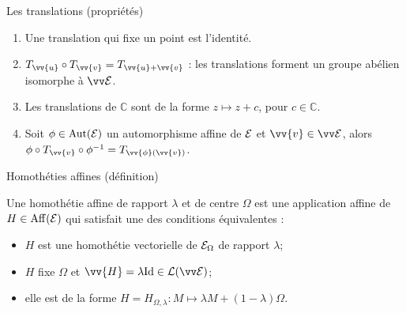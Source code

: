 \documentclass{m53beamer}
\begin{document}
  \begin{frame}{Les translations (propriétés)}
    \begin{enumerate}[<+(1)->]
      \item Une translation qui fixe un point est l'identité.
      \item $T_{\vv{u}}\circ T_{\vv{v}} = T_{\vv{u}+\vv{v}}$ : les translations forment un groupe abélien isomorphe à $\ev{E}$.
      \item Les translations de $\mathbb{C}$ sont de la forme $z \mapsto z+c$, pour $c \in \mathbb{C}$.
      \item Soit $\phi \in \operatorname{Aut}(\mathcal{E})$ un automorphisme affine de $\mathcal{E}$ et $\vv{v} \in \ev{E}$, alors $\phi\circ T_{\vv{v}}\circ\phi^{-1}=T_{\vv{\phi}(\vv{v})}$.
    \end{enumerate}
  \end{frame}
  \begin{frame}{Homothéties affines (définition)}
    \begin{defprop}
      Une \alert{homothétie affine de rapport $\lambda$ et de centre $\Omega$} est une application affine de $H \in\operatorname{Aff}(\mathcal{E})$ qui satisfait une des conditions équivalentes :
      \begin{itemize}[<+(1)->]
        \item $H$ est une homothétie vectorielle de $\mathcal{E}_{\Omega}$ de rapport $\lambda$;
        \item $H$ fixe $\Omega$ et $\vv{H}=\lambda\id \in \lin(\ev{E})$;
        \item elle est de la forme $H=H_{\Omega,\lambda}:M \mapsto \lambda M + (1- \lambda)\Omega$.
      \end{itemize}
    \end{defprop}
  \end{frame}
\end{document}
